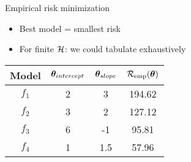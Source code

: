 \documentclass[11pt,compress,t,notes=noshow, xcolor=table]{beamer}
\begin{document}
\begin{vbframe}{Empirical risk minimization}

\begin{itemize}
    \item Best model = smallest risk
    \item For finite $\mathcal{H}$: we could tabulate exhaustively
\end{itemize}

\lz

\begin{center}
\begin{tabular}{ c | c | c || c }
 Model & \(\displaystyle \bm{\theta}_{intercept} \) & \(\displaystyle \bm{\theta}_{slope} \) & \(\displaystyle \mathcal{R}_{\text{emp}}(\bm{\theta}) \) \\ 
 \hline
\(\displaystyle f_1 \)   & 2 & 3 & 194.62 \\
\(\displaystyle f_2 \)   & 3 & 2 & 127.12 \\  
\(\displaystyle f_3 \)   & 6 & -1 & 95.81 \\
\rowcolor{lightgray}
\(\displaystyle f_4 \)   & 1 & 1.5 & 57.96 \\  
\end{tabular}
\end{center}


\end{vbframe}
\end{document}
